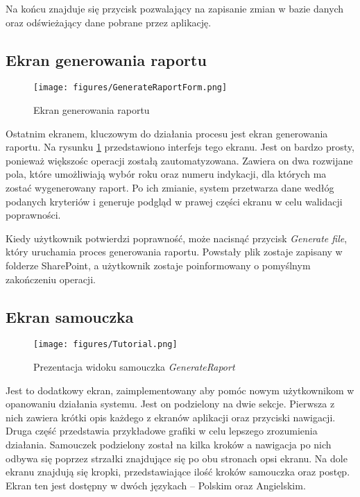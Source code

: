  Na końcu znajduje się przycisk pozwalający na zapisanie zmian w bazie danych oraz odświeżający dane pobrane przez aplikację.

 \subsection{Ekran generowania raportu}

 \begin{figure}[H]
     \centering
     \texttt{[image: figures/GenerateRaportForm.png]}
     \caption{Ekran generowania raportu}
     \label{fig:generateraportform}
 \end{figure}

 Ostatnim ekranem, kluczowym do działania procesu jest ekran generowania raportu. Na rysunku \ref{fig:generateraportform} przedstawiono interfejs tego ekranu. Jest on bardzo prosty, ponieważ większośc operacji zostałą zautomatyzowana. Zawiera on dwa rozwijane pola, które umożliwiają wybór roku oraz numeru indykacji, dla których ma zostać wygenerowany raport. Po ich zmianie, system przetwarza dane wedłóg podanych kryteriów i generuje podgląd w prawej części ekranu w celu walidacji poprawności.

 Kiedy użytkownik potwierdzi poprawność, może nacisnąć przycisk \emph{Generate file}, który uruchamia proces generowania raportu. Powstały plik zostaje zapisany w folderze SharePoint, a użytkownik zostaje poinformowany o pomyślnym zakończeniu operacji.

 \subsection{Ekran samouczka}

 \begin{figure}[H]
    \centering
    \texttt{[image: figures/Tutorial.png]}
    \caption{Prezentacja widoku samouczka \emph{GenerateRaport}}
    \label{fig:tutorial}
\end{figure}

Jest to dodatkowy ekran, zaimplementowany aby pomóc nowym użytkownikom w opanowaniu działania systemu. Jest on podzielony na dwie sekcje. Pierwsza z nich zawiera krótki opis każdego z ekranów aplikacji oraz przyciski nawigacji. Druga część przedstawia przykładowe grafiki w celu lepszego zrozumienia działania. Samouczek podzielony został na kilka kroków a nawigacja po nich odbywa się poprzez strzałki znajdujące się po obu stronach opsi ekranu. Na dole ekranu znajdują się kropki, przedstawiające ilość kroków samouczka oraz postęp. Ekran ten jest dostępny w dwóch językach -- Polskim oraz Angielskim. 
